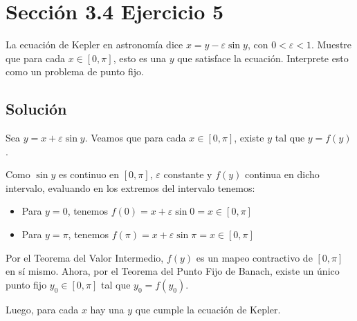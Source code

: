 \documentclass[12pt]{article}
\begin{document}
\section{Sección 3.4 Ejercicio 5}
La ecuación de Kepler en astronomía dice $x = y - \varepsilon \sin{y}$, con $0 < \varepsilon < 1$. Muestre que para cada $x \in [0, \pi]$, esto es una $y$ que satisface la ecuación. Interprete esto como un problema de punto fijo.
\subsection{Solución}
Sea $y=x+\varepsilon\sin{y}$. Veamos que para cada $x \in [0, \pi]$, existe $y$ tal que $y = f(y)$.

Como $\sin{y}$ es continuo en $[0, \pi]$, $\varepsilon$ constante y $f(y)$ continua en dicho intervalo, evaluando en los extremos del intervalo tenemos:
\begin{itemize}
    \item Para $y=0$, tenemos $f(0) = x+\varepsilon\sin{0} = x \in [0, \pi]$
    \item Para $y=\pi$, tenemos $f(\pi) = x+\varepsilon\sin{\pi} = x \in [0, \pi]$
\end{itemize}

Por el Teorema del Valor Intermedio, $f(y)$ es un mapeo contractivo de $[0, \pi]$ en sí mismo. Ahora, por el Teorema del Punto Fijo de Banach, existe un único punto fijo $y_0 \in [0, \pi]$ tal que $y_0 = f(y_0)$.

Luego, para cada $x$ hay una $y$ que cumple la ecuación de Kepler.
\end{document}
